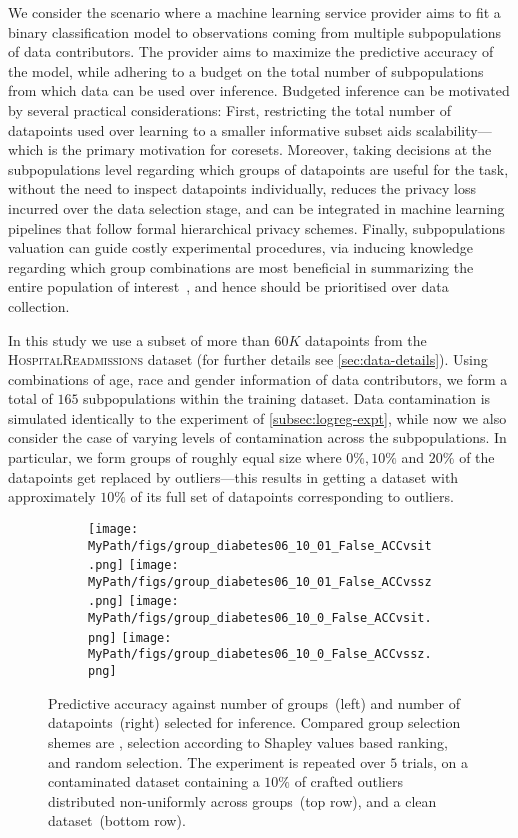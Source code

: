 We consider the scenario where a machine learning service provider aims to fit a binary classification model to observations coming from multiple subpopulations of data contributors. The provider aims to maximize the predictive accuracy of the model, while adhering to a budget on the total number of subpopulations from which data can be used over inference. Budgeted inference can be motivated by several practical considerations: First, restricting the total number of datapoints used over learning to a smaller informative subset aids scalability---which is the primary motivation for coresets. Moreover, taking decisions at the subpopulations level regarding which groups of datapoints are useful for the task, without the need to inspect datapoints individually, reduces the privacy loss incurred over the data selection stage, and can be integrated in machine learning pipelines that follow formal hierarchical privacy schemes. Finally, subpopulations valuation can guide costly experimental procedures, via inducing knowledge regarding which group combinations are most beneficial in summarizing the entire population of interest~\citep{pinsler19, vahidian20}, and hence should be prioritised over data collection.

In this study we use a subset of more than $60K$ datapoints from the \textsc{HospitalReadmissions} dataset (for further details see \cref{sec:data-details}). Using combinations of age, race and gender information of data contributors, we form a total of $165$ subpopulations within the training dataset. Data contamination is simulated identically to the experiment of \cref{subsec:logreg-expt}, while now we also consider the case of varying levels of contamination across the subpopulations. In particular, we form groups of roughly equal size where $0\%, 10\%$ and $20\%$ of the datapoints get replaced by outliers---this results in getting a dataset with approximately $10\%$ of its full set of datapoints corresponding to outliers.


\begin{figure}[t!]
	\begin{subfigure}[b]{0.9\textwidth} 
		\centering
		\texttt{[image: \\MyPath/figs/group\_diabetes06\_10\_01\_False\_ACCvsit.png]}
		\hfill
		\texttt{[image: \\MyPath/figs/group\_diabetes06\_10\_01\_False\_ACCvssz.png]}
		\centering
		\hfill
		\texttt{[image: \\MyPath/figs/group\_diabetes06\_10\_0\_False\_ACCvsit.png]}
		\centering
		\hfill
		\texttt{[image: \\MyPath/figs/group\_diabetes06\_10\_0\_False\_ACCvssz.png]}
	\end{subfigure}	
	\centering
	\caption{Predictive accuracy against number of groups~(left) and number of datapoints~(right) selected for inference. Compared group selection shemes are \bcores{}, selection according to Shapley values based ranking, and random selection. The experiment is repeated over $5$ trials, on a contaminated dataset containing a $10\%$ of crafted outliers distributed non-uniformly across groups~(top row), and a clean dataset~(bottom row).}
	\label{fig:group_plot}
\end{figure}


